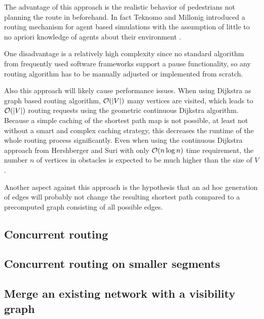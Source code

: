 		The advantage of this approach is the realistic behavior of pedestrians not planning the route in beforehand.
		In fact Teknomo and Millonig introduced a routing mechanism for agent based simulations with the assumption of little to no apriori knowledge of agents about their environment \cite{teknomo-millonig-routing}.
		
		One disadvantage is a relatively high complexity since no standard algorithm from frequently used software frameworks support a pause functionality, so any routing algorithm has to be manually adjusted or implemented from scratch.
		
		Also this approach will likely cause performance issues.
		When using Dijkstra as graph based routing algorithm, $\mathcal{O}(|V|)$ many vertices are visited, which leads to $\mathcal{O}(|V|)$ routing requests using the geometric continuous Dijkstra algorithm.
		Because a simple caching of the shortest path map is not possible, at least not without a smart and complex caching strategy, this decreases the runtime of the whole routing process significantly.
		Even when using the continuous Dijkstra approach from Hershberger and Suri \cite{hershberger-suri} with only $\mathcal{O}(n \log n)$ time requirement, the number $n$ of vertices in obstacles is expected to be much higher than the size of $V$.
		
		Another aspect against this approach is the hypothesis that an ad hoc generation of edges will probably not change the resulting shortest path compared to a precomputed graph consisting of all possible edges.
		
	\subsection{Concurrent routing}
	
	\subsection{Concurrent routing on smaller segments}
	
	\subsection{Merge an existing network with a visibility graph}